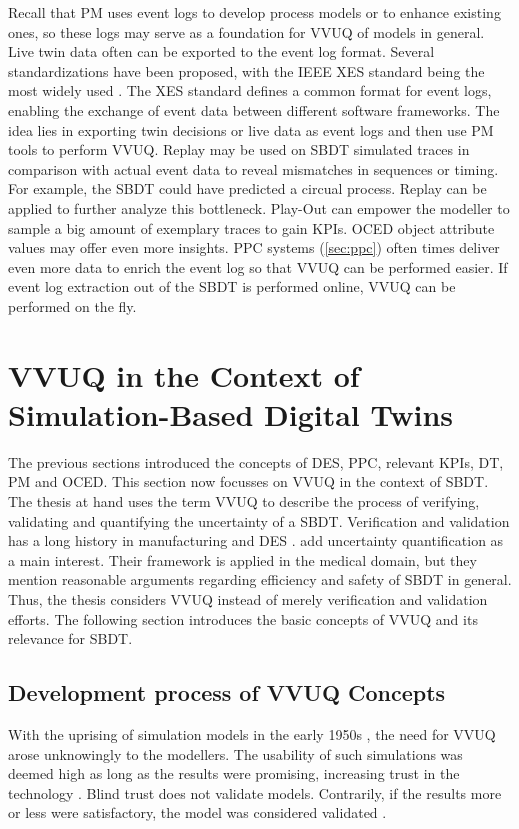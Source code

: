 Recall that PM uses event logs to develop process models or to enhance existing ones, so these logs may serve as a foundation for VVUQ of models in general. Live twin data often can be exported to the event log format. Several standardizations have been proposed, with the IEEE XES standard being the most widely used \autocite{van2016data}. The XES standard defines a common format for event logs, enabling the exchange of event data between different software frameworks. The idea lies in exporting twin decisions or live data as event logs and then use PM tools to perform VVUQ.
Replay may be used on SBDT simulated traces in comparison with actual event data to reveal mismatches in sequences or timing. For example, the SBDT could have predicted a circual process. Replay can be applied to further analyze this bottleneck. Play-Out can empower the modeller to sample a big amount of exemplary traces to gain KPIs. OCED object attribute values may offer even more insights.
PPC systems (\autoref{sec:ppc}) often times deliver even more data to enrich the event log so that VVUQ can be performed easier. If event log extraction out of the SBDT is performed online, VVUQ can be performed on the fly.

\section{VVUQ in the Context of Simulation-Based Digital Twins}
\label{sec:vvuq-sbdt}

The previous sections introduced the concepts of DES, PPC, relevant KPIs, DT, PM and OCED. This section now focusses on VVUQ in the context of SBDT. The thesis at hand uses the term VVUQ to describe the process of verifying, validating and quantifying the uncertainty of a SBDT. Verification and validation has a long history in manufacturing and DES \autocite{Bitencourt2023}. \Autocite{sel2025survey} add uncertainty quantification as a main interest. Their framework is applied in the medical domain, but they mention reasonable arguments regarding efficiency and safety of SBDT in general. Thus, the thesis considers VVUQ instead of merely verification and validation efforts. The following section introduces the basic concepts of VVUQ and its relevance for SBDT.


\subsection{Development process of VVUQ Concepts}
\label{sec:historical-development}
With the uprising of simulation models in the early 1950s \autocite{evans1967simulation}, the need for VVUQ arose unknowingly to the modellers. The usability of such simulations was deemed high as long as the results were promising, increasing trust in the technology \autocite{durst2017historical}. Blind trust does not validate models. Contrarily, if the results more or less were satisfactory, the model was considered validated \autocite{bonani2003physics}.

